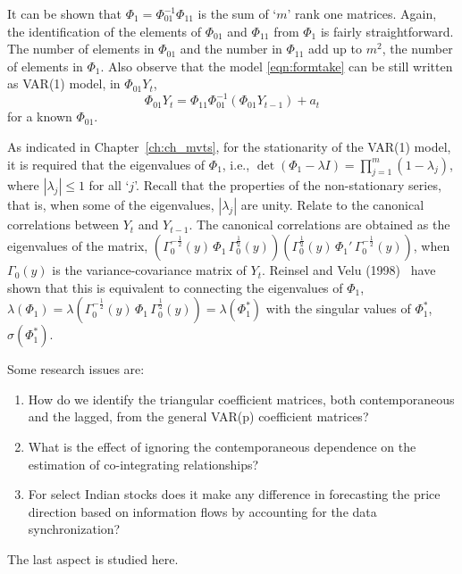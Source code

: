 It can be shown that $\Phi_1= \Phi_{01}^{-1} \Phi_{11}$ is the sum of `$m$' rank one matrices. Again, the identification of the elements of $\Phi_{01}$ and $\Phi_{11}$ from $\Phi_1$ is fairly straightforward. The number of elements in $\Phi_{01}$ and the number in $\Phi_{11}$ add up to $m^2$, the number of elements in $\Phi_1$. Also observe that the model \eqref{eqn:formtake} can be still written as VAR(1) model, in $\Phi_{01} Y_t$,
	\begin{equation} \label{eqn:var1phimod}
	\Phi_{01} Y_t = \Phi_{11} \Phi_{01}^{-1} ( \Phi_{01} Y_{t-1}) + a_t
	\end{equation}
for a known $\Phi_{01}$.


As indicated in Chapter~\ref{ch:ch_mvts}, for the stationarity of the VAR(1) model, it is required that the eigenvalues of $\Phi_1$, i.e., $\det(\Phi_1 - \lambda I)= \prod_{j=1}^m (1-\lambda_j)$, where $|\lambda_j| \leq 1$ for all `$j$'. Recall that the properties of the non-stationary series, that is, when some of the eigenvalues, $|\lambda_j|$ are unity. Relate to the canonical correlations between $Y_t$ and $Y_{t-1}$. The canonical correlations are obtained as the eigenvalues of the matrix, $(\Gamma_0^{- \frac{1}{2}} (y)\, \Phi_1 \,\Gamma_0^{\frac{1}{2}}(y)) ( \Gamma_0^{\frac{1}{2}}(y) \,\Phi_1'\,  \Gamma_0^{-\frac{1}{2}}(y))$, when $\Gamma_0(y)$ is the variance-covariance matrix of $Y_t$. Reinsel and Velu (1998)~\cite{velurein} have shown that this is equivalent  to connecting the eigenvalues of $\Phi_1$, $\lambda(\Phi_1)= \lambda( \Gamma_0^{-\frac{1}{2}} (y) \,\Phi_1\, \Gamma_0^{\frac{1}{2}}(y))= \lambda(\Phi_1^*)$ with the singular values of $\Phi_1^*$, $\sigma(\Phi_1^*)$. 


Some research issues are: 


\begin{enumerate}[--]
\item How do we identify the triangular coefficient matrices, both contemporaneous and the lagged, from the general VAR(p) coefficient matrices?
\item What is the effect of ignoring the contemporaneous dependence on the estimation of co-integrating relationships?
\item For select Indian stocks does it make any difference in forecasting the price direction based on information flows by accounting for the data synchronization?
\end{enumerate}
The last aspect is studied here. 


